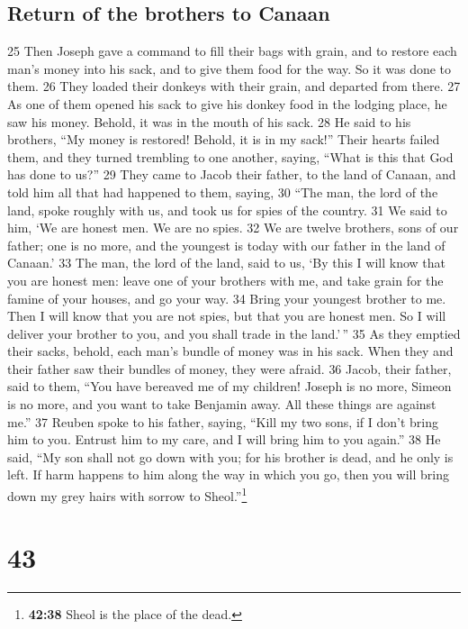 \hypertarget{return-of-the-brothers-to-canaan}{%
\subsection{Return of the brothers to
Canaan}\label{return-of-the-brothers-to-canaan}}

{25} Then Joseph gave a command to fill their bags with grain, and to
restore each man's money into his sack, and to give them food for the
way. So it was done to them. {26} They loaded their donkeys with their
grain, and departed from there. {27} As one of them opened his sack to
give his donkey food in the lodging place, he saw his money. Behold, it
was in the mouth of his sack. {28} He said to his brothers, ``My money
is restored! Behold, it is in my sack!'' Their hearts failed them, and
they turned trembling to one another, saying, ``What is this that God
has done to us?'' {29} They came to Jacob their father, to the land of
Canaan, and told him all that had happened to them, saying, {30} ``The
man, the lord of the land, spoke roughly with us, and took us for spies
of the country. {31} We said to him, `We are honest men. We are no
spies. {32} We are twelve brothers, sons of our father; one is no more,
and the youngest is today with our father in the land of Canaan.' {33}
The man, the lord of the land, said to us, `By this I will know that you
are honest men: leave one of your brothers with me, and take grain for
the famine of your houses, and go your way. {34} Bring your youngest
brother to me. Then I will know that you are not spies, but that you are
honest men. So I will deliver your brother to you, and you shall trade
in the land.'\,'' {35} As they emptied their sacks, behold, each man's
bundle of money was in his sack. When they and their father saw their
bundles of money, they were afraid. {36} Jacob, their father, said to
them, ``You have bereaved me of my children! Joseph is no more, Simeon
is no more, and you want to take Benjamin away. All these things are
against me.'' {37} Reuben spoke to his father, saying, ``Kill my two
sons, if I don't bring him to you. Entrust him to my care, and I will
bring him to you again.'' {38} He said, ``My son shall not go down with
you; for his brother is dead, and he only is left. If harm happens to
him along the way in which you go, then you will bring down my grey
hairs with sorrow to Sheol.''\footnote{\textbf{42:38} Sheol is the place
  of the dead.}

\hypertarget{section-42}{%
\section{43}\label{section-42}}

